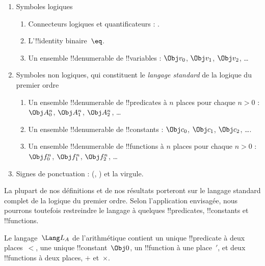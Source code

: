 \documentclass[../../../include/open-logic-section]{subfiles}
\begin{document}
\begin{enumerate}
\item Symboles logiques
\begin{enumerate}
\item Connecteurs logiques et quantificateurs :
  \startycommalist
  .
\item L'!!{identity} binaire~$\eq$.
\item Un ensemble !!{denumerable} de !!{variable}s : $\Obj v_0$,
  $\Obj v_1$, $\Obj v_2$, \dots
\end{enumerate}
\item Symboles non logiques, qui constituent le \emph{langage standard}
  de la logique du premier ordre
\begin{enumerate}
\item Un ensemble !!{denumerable} de !!{predicate}s à $n$ places
  pour chaque $n>0$ : $\Obj A^n_0$, $\Obj A^n_1$,
  $\Obj A^n_2$, \dots
\item Un ensemble !!{denumerable} de !!{constant}s : $\Obj c_0$,
  $\Obj c_1$, $\Obj c_2$, \dots.
\item Un ensemble !!{denumerable} de !!{function}s à $n$ places
  pour chaque $n>0$ : $\Obj f^n_0$, $\Obj f^n_1$,
  $\Obj f^n_2$, \dots
\end{enumerate}
\item Signes de ponctuation : (, ) et la virgule.
\end{enumerate}

La plupart de nos définitions et de nos résultats porteront sur le
langage standard complet de la logique du premier ordre. Selon
l'application envisagée, nous pourrons toutefois restreindre le
langage à quelques !!{predicate}s, !!{constant}s et !!{function}s.

\begin{ex}
Le langage~$\Lang L_A$ de l'arithmétique contient un unique
!!{predicate} à deux places~$<$, une unique !!{constant}~$\Obj 0$,
un !!{function} à une place~$\prime$, et deux !!{function}s à deux
places, $+$ et~$\times$.
\end{ex}
\end{document}
